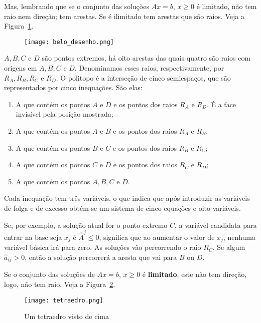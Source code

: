 \newpage

Mas, lembrando que se o conjunto das soluções $ Ax = b $, $ x \geq 0 $ é limitado,
não tem raio nem direção; tem arestas.
Se é ilimitado tem arestas que são raios.
Veja a Figura~\ref{fig:planos}.

\begin{figure}[!h]
  \centering
  \texttt{[image: belo\_desenho.png]}  
  \caption{}
  \label{fig:planos}
\end{figure}

$ A, B, C \text{ e } D $ são pontos extremos, há oito arestas das quais quatro
são raios com origens em $ A, B, C \text{ e } D $.
Denominamos esses raios, respectivamente, por $ R_A, R_B, R_C \text{ e } R_D $.
O politopo é a interseção de cinco semiespaços, que são representados por cinco
inequações.
São elas:

\begin{enumerate}
  \item A que contém os pontos $ A $ e $ D $ e os pontos dos raios $ R_A $ e 
    $ R_D $.
    É a face invisível pela posição mostrada;
  \item A que contém os pontos $ A $ e $ B $ e os pontos dos raios $ R_A $ e
    $ R_B $;
  \item A que contém os pontos $ B $ e $ C $ e os pontos dos raios $ R_B $ e 
    $ R_C $;
  \item A que contém os pontos $ C $ e $ D $ e os pontos dos raios $ R_C $ e 
  $ R_D $;
  \item A que contém os pontos $ A, B, C \text{ e } D $.
\end{enumerate}

Cada inequação tem três variáveis, o que indica que após introduzir  as variáveis
de folga e de excesso obtém-se um sistema de cinco equações e oito variáveis.

Se, por exemplo, a solução atual for o ponto extremo $ C $, a variável candidata
para entrar na base seja $ x_j $ é $ \widehat{A}^j \leq 0 $, significa que ao
aumentar o valor de $ x_j $, nenhuma variável básica irá para zero.
As soluções vão percorrendo o raio $ R_C $.
Se algum $ \widehat{a}_{ij} > 0 $, então a solução percorrerá a aresta que vai
para $ B $ ou $ D $.

Se o conjunto das soluções de $ Ax = b $, $ x \geq 0 $ é \textbf{limitado}, este
não tem direção, logo, não tem raio.
Veja a Figura~\ref{fig:tetraedro}.

\begin{figure}[!h]
  \centering
  \texttt{[image: tetraedro.png]}  
  \caption{Um tetraedro visto de cima}
  \label{fig:tetraedro}
\end{figure}

